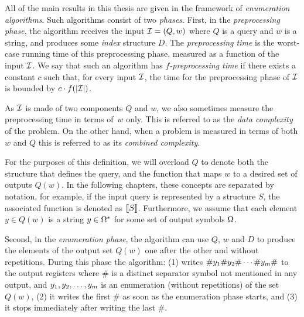 All of the main results in this thesis are given in the framework of \emph{enumeration algorithms}.
Such algorithms consist of two \emph{phases}.
%
First, in the \emph{preprocessing phase},
the algorithm receives the input $\mathcal{I} = (Q, w)$ where $Q$ is a query and $w$ is a string, and produces some
\emph{index} structure $D$.
The \emph{preprocessing time} is the worst-case running time of this
preprocessing phase, measured as a function of the input $\mathcal{I}$.
We say that such an algorithm has \emph{$f$-preprocessing time} if there exists a constant $c$ such that, for every input $\mathcal{I}$, the time for the preprocessing phase of $\mathcal{I}$ is bounded by $c \cdot f(|\mathcal{I}|)$.   

As $\mathcal{I}$ is made of two components $Q$ and $w$, we also sometimes measure the preprocessing time in terms of~$w$ only. This is referred to as the \emph{data complexity} of the problem. On the other hand, when a problem is measured in terms of both $w$ and $Q$ this is referred to as its \emph{combined complexity}.


For the purposes of this definition, we will overload $Q$ to denote both the structure that defines the query, and the function that maps $w$ to a desired set of outputs $Q(w)$. In the following chapters, these concepts are separated by notation, for example, if the input query is represented by a structure $S$, the associated function is denoted as ${\llbracket{S}\rrbracket}$. Furthermore, we assume that each element $y\in Q(w)$ is a string $y\in \Omega^*$  for some set of output symbols $\Omega$. 

Second, in the \emph{enumeration phase}, the algorithm can use $Q$, $w$ and $D$ to produce the elements of the output set $Q(w)$ one after the other and without
repetitions.
During this phase the algorithm:
(1) writes $\# y_1 \# y_2\#\cdots\#y_m\#$ to the output registers where \# is a distinct separator symbol not mentioned in any output, and $y_1,y_2,\ldots,y_m$ is an enumeration (without repetitions) of the set $Q(w)$,
(2) it writes the first \# as soon as the enumeration phase starts, and 
(3) it stops immediately after writing the last \#.

